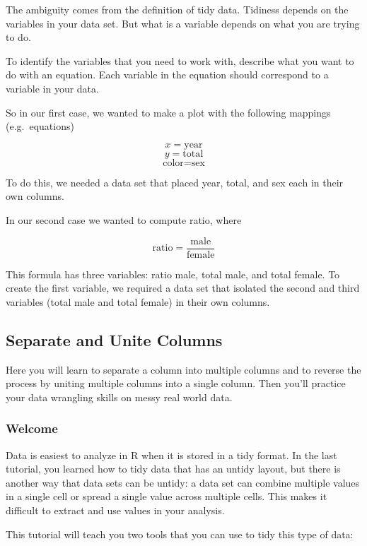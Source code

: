\documentclass[
]{article}
\begin{document}
The ambiguity comes from the definition of tidy data. Tidiness depends
on the variables in your data set. But what is a variable depends on
what you are trying to do.

To identify the variables that you need to work with, describe what you
want to do with an equation. Each variable in the equation should
correspond to a variable in your data.

So in our first case, we wanted to make a plot with the following
mappings (e.g.~equations)

\[x = \mbox{year}\] \[y=\mbox{total}\] \[\mbox{color}=\mbox{sex}\]

To do this, we needed a data set that placed year, total, and sex each
in their own columns.

In our second case we wanted to compute ratio, where

\[\mbox{ratio}=\frac{\mbox{male}}{\mbox{female}}\]

This formula has three variables: ratio male, total male, and total
female. To create the first variable, we required a data set that
isolated the second and third variables (total male and total female) in
their own columns.

\hypertarget{separate-and-unite-columns}{%
\subsection{Separate and Unite
Columns}\label{separate-and-unite-columns}}

Here you will learn to separate a column into multiple columns and to
reverse the process by uniting multiple columns into a single column.
Then you'll practice your data wrangling skills on messy real world
data.

\hypertarget{welcome-14}{%
\subsubsection{Welcome}\label{welcome-14}}

Data is easiest to analyze in R when it is stored in a tidy format. In
the last tutorial, you learned how to tidy data that has an untidy
layout, but there is another way that data sets can be untidy: a data
set can combine multiple values in a single cell or spread a single
value across multiple cells. This makes it difficult to extract and use
values in your analysis.

This tutorial will teach you two tools that you can use to tidy this
type of data:
\end{document}
